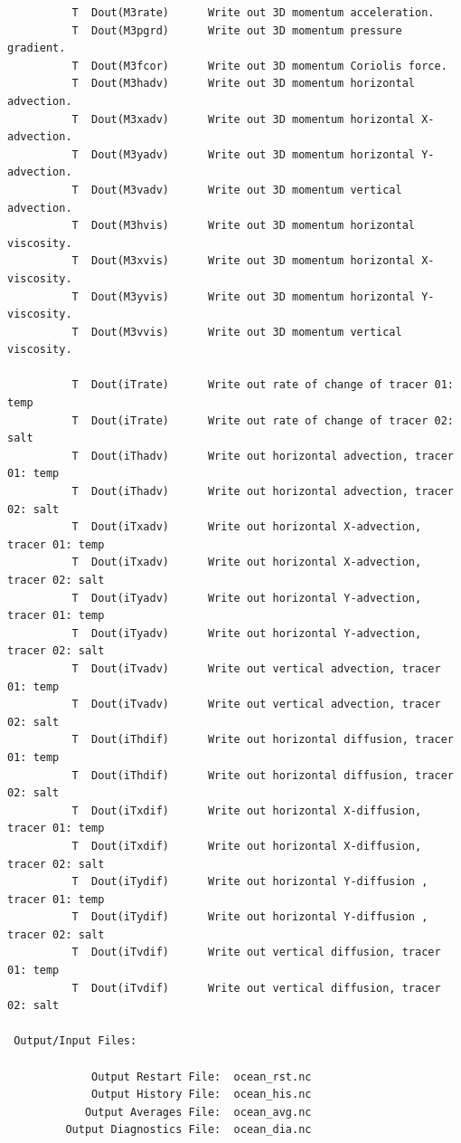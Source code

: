 \begin{verbatim}
          T  Dout(M3rate)      Write out 3D momentum acceleration.
          T  Dout(M3pgrd)      Write out 3D momentum pressure gradient.
          T  Dout(M3fcor)      Write out 3D momentum Coriolis force.
          T  Dout(M3hadv)      Write out 3D momentum horizontal advection.
          T  Dout(M3xadv)      Write out 3D momentum horizontal X-advection.
          T  Dout(M3yadv)      Write out 3D momentum horizontal Y-advection.
          T  Dout(M3vadv)      Write out 3D momentum vertical advection.
          T  Dout(M3hvis)      Write out 3D momentum horizontal viscosity.
          T  Dout(M3xvis)      Write out 3D momentum horizontal X-viscosity.
          T  Dout(M3yvis)      Write out 3D momentum horizontal Y-viscosity.
          T  Dout(M3vvis)      Write out 3D momentum vertical viscosity.

          T  Dout(iTrate)      Write out rate of change of tracer 01: temp
          T  Dout(iTrate)      Write out rate of change of tracer 02: salt
          T  Dout(iThadv)      Write out horizontal advection, tracer 01: temp
          T  Dout(iThadv)      Write out horizontal advection, tracer 02: salt
          T  Dout(iTxadv)      Write out horizontal X-advection, tracer 01: temp
          T  Dout(iTxadv)      Write out horizontal X-advection, tracer 02: salt
          T  Dout(iTyadv)      Write out horizontal Y-advection, tracer 01: temp
          T  Dout(iTyadv)      Write out horizontal Y-advection, tracer 02: salt
          T  Dout(iTvadv)      Write out vertical advection, tracer 01: temp
          T  Dout(iTvadv)      Write out vertical advection, tracer 02: salt
          T  Dout(iThdif)      Write out horizontal diffusion, tracer 01: temp
          T  Dout(iThdif)      Write out horizontal diffusion, tracer 02: salt
          T  Dout(iTxdif)      Write out horizontal X-diffusion, tracer 01: temp
          T  Dout(iTxdif)      Write out horizontal X-diffusion, tracer 02: salt
          T  Dout(iTydif)      Write out horizontal Y-diffusion , tracer 01: temp
          T  Dout(iTydif)      Write out horizontal Y-diffusion , tracer 02: salt
          T  Dout(iTvdif)      Write out vertical diffusion, tracer 01: temp
          T  Dout(iTvdif)      Write out vertical diffusion, tracer 02: salt

 Output/Input Files:

             Output Restart File:  ocean_rst.nc
             Output History File:  ocean_his.nc
            Output Averages File:  ocean_avg.nc
         Output Diagnostics File:  ocean_dia.nc


\end{verbatim}
